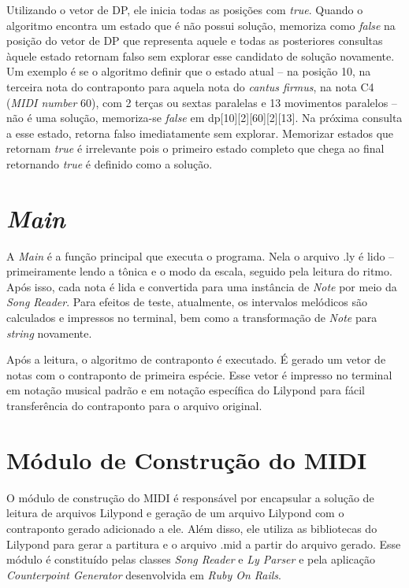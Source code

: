     Utilizando o vetor de DP, ele inicia todas as posições com \textit{true}. Quando o algoritmo encontra um estado que é não possui solução, memoriza como \textit{false} na posição do vetor de DP que representa aquele e todas as posteriores consultas àquele estado retornam falso sem explorar esse candidato de solução novamente. Um exemplo é se o algoritmo definir que o estado atual -- na posição 10, na terceira nota do contraponto para aquela nota do \textit{cantus firmus}, na nota C4 (\textit{MIDI number} 60), com 2 terças ou sextas paralelas e 13 movimentos paralelos -- não é uma solução, memoriza-se \textit{false} em dp[10][2][60][2][13]. Na próxima consulta a esse estado, retorna falso imediatamente sem explorar. Memorizar estados que retornam \textit{true} é irrelevante pois o primeiro estado completo que chega ao final retornando \textit{true} é definido como a solução.


  \section[\textit{Main}]{\textit{Main}}

    A \textit{Main} é a função principal que executa o programa. Nela o arquivo .ly é lido -- primeiramente lendo a tônica e o modo da escala, seguido pela leitura do ritmo. Após isso, cada nota é lida e convertida para uma instância de \textit{Note} por meio da \textit{Song Reader}. Para efeitos de teste, atualmente, os intervalos melódicos são calculados e impressos no terminal, bem como a transformação de \textit{Note} para \textit{string} novamente.

    Após a leitura, o algoritmo de contraponto é executado. É gerado um vetor de notas com o contraponto de primeira espécie. Esse vetor é impresso no terminal em notação musical padrão e em notação específica do Lilypond para fácil transferência do contraponto para o arquivo original.

  \section[Módulo de Construção do MIDI]{Módulo de Construção do MIDI}

    O módulo de construção do MIDI é responsável por encapsular a solução de leitura de arquivos Lilypond e geração de um arquivo Lilypond com o contraponto gerado adicionado a ele. Além disso, ele utiliza as bibliotecas do Lilypond para gerar a partitura e o arquivo .mid a partir do arquivo gerado. Esse módulo é constituído pelas classes \textit{Song Reader} e \textit{Ly Parser} e pela aplicação \textit{Counterpoint Generator} desenvolvida em \textit{Ruby On Rails}.

